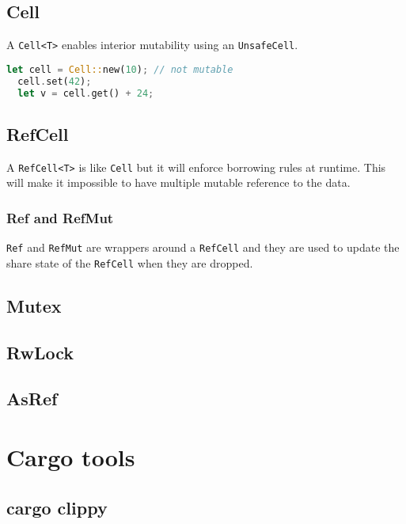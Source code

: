 \documentclass[a4paper]{article}
\begin{document}
\subsection{Cell}

A \texttt{Cell<T>} enables interior mutability using an \texttt{UnsafeCell}.

\begin{lstlisting}[language=Rust, style=boxed, numbers=none]
  let cell = Cell::new(10); // not mutable
  cell.set(42);
  let v = cell.get() + 24;
\end{lstlisting}

\subsection{RefCell}

A \texttt{RefCell<T>} is like \texttt{Cell} but it will enforce
borrowing rules at runtime. This will make it impossible
to have multiple mutable reference to the data.

\subsubsection{Ref and RefMut}

\texttt{Ref} and \texttt{RefMut} are wrappers around a \texttt{RefCell}
and they are used to update the share state of the \texttt{RefCell}
when they are dropped.

\subsection{Mutex}

\subsection{RwLock}

\subsection{AsRef}

\pagebreak

\section{Cargo tools}

\subsection{cargo clippy}
\end{document}
